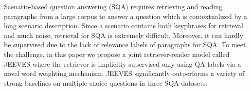 Scenario-based question answering (SQA) requires retrieving and reading paragraphs from a large corpus to answer a question which is contextualized by a long scenario description. Since a scenario contains both keyphrases for retrieval and much noise, retrieval for SQA is extremely difficult. Moreover, it can hardly be supervised due to the lack of relevance labels of paragraphs for SQA. To meet the challenge, in this paper we propose a joint retriever-reader model called JEEVES where the retriever is implicitly supervised only using QA labels via a novel word weighting mechanism. JEEVES significantly outperforms a variety of strong baselines on multiple-choice questions in three SQA datasets.
